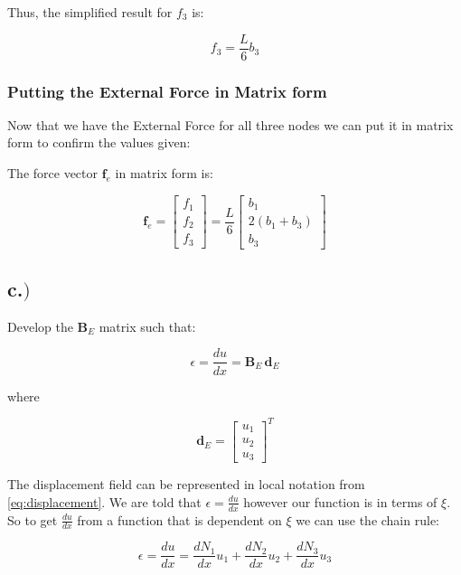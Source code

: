 \documentclass{article}
\begin{document}
Thus, the simplified result for \( f_3 \) is:

\begin{equation}
    f_3 = \frac{L}{6} b_3
\end{equation}

\subsubsection*{Putting the External Force in Matrix form}
Now that we have the External Force for all three nodes we can put it in matrix form to confirm the values given:

The force vector \( \mathbf{f}_e \) in matrix form is:

\begin{equation}
    \mathbf{f}_e = \begin{bmatrix} f_1 \\ f_2 \\ f_3 \end{bmatrix} = \frac{L}{6} \begin{bmatrix} b_1 \\ 2(b_1 + b_3) \\ b_3 \end{bmatrix}
\end{equation}

\newpage
\subsection*{c.$)$}
Develop the \( \mathbf{B}_E \) matrix such that:

\begin{equation}
    \epsilon = \frac{du}{dx} = \mathbf{B}_E \, \mathbf{d}_E
\end{equation}

where

\begin{equation}
    \mathbf{d}_E = \begin{bmatrix} u_1 \\ u_2 \\ u_3 \end{bmatrix}^T
\end{equation}

The displacement field can be represented in local notation from \ref{eq:displacement}.
We are told that $\epsilon = \frac{du}{dx}$ however our function is in terms of $\xi$.
So to get $\frac{du}{dx}$ from a function that is dependent on $\xi$ we can use the chain rule:

\begin{equation}
    \epsilon = \frac{du}{dx} = \frac{dN_1}{dx} u_1 + \frac{dN_2}{dx} u_2 + \frac{dN_3}{dx} u_3
\end{equation}
\end{document}
